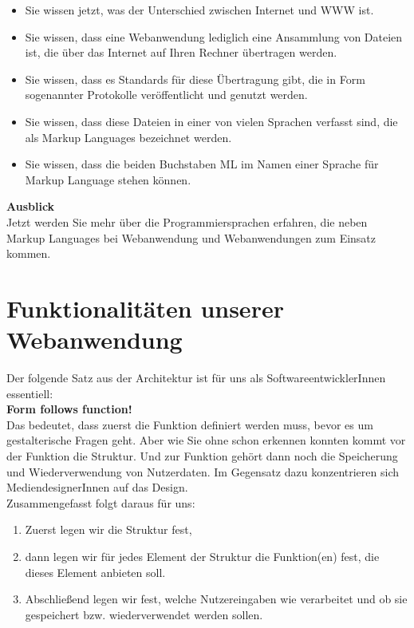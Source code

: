 \begin{itemize}
	\item Sie wissen jetzt, was der Unterschied zwischen Internet und WWW ist.
	\item Sie wissen, dass eine Webanwendung lediglich eine Ansammlung von Dateien ist, die über das Internet auf Ihren Rechner übertragen werden.
	\item Sie wissen, dass es Standards für diese Übertragung gibt, die in Form sogenannter Protokolle veröffentlicht und genutzt werden.
	\item Sie wissen, dass diese Dateien in einer von vielen Sprachen verfasst sind, die als Markup Languages bezeichnet werden.
	\item Sie wissen, dass die beiden Buchstaben ML im Namen einer Sprache für Markup Language stehen können.
\end{itemize}

\textbf{Ausblick}\\

Jetzt werden Sie mehr über die Programmiersprachen erfahren, die neben Markup Languages bei Webanwendung und Webanwendungen zum Einsatz kommen.\\

\section{Funktionalitäten unserer Webanwendung}

Der folgende Satz aus der Architektur ist für uns als SoftwareentwicklerInnen essentiell:\\

\textbf{Form follows function!}\\

Das bedeutet, dass zuerst die Funktion definiert werden muss, bevor es um gestalterische Fragen geht. Aber wie Sie ohne schon erkennen konnten kommt vor der Funktion die Struktur. Und zur Funktion gehört dann noch die Speicherung und Wiederverwendung von Nutzerdaten. Im Gegensatz dazu konzentrieren sich MediendesignerInnen auf das Design.\\

Zusammengefasst folgt daraus für uns:\\

\begin{enumerate}
	\item Zuerst legen wir die Struktur fest,
	\item dann legen wir für jedes Element der Struktur die Funktion(en) fest, die dieses Element anbieten soll.
	\item Abschließend legen wir fest, welche Nutzereingaben wie verarbeitet und ob sie gespeichert bzw. wiederverwendet werden sollen.
\end{enumerate}

